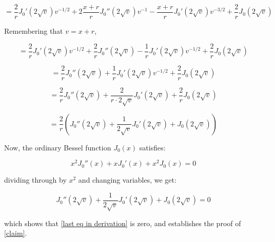 \documentclass{article}
\begin{document}
\begin{equation*}
=\frac{2}{r} J_0'(2\sqrt{v}) v^{-1/2} + 2\frac{x+r}{r} J_0''(2\sqrt{v}) v^{-1} - \frac{x+r}{r} J_0'(2\sqrt{v}) v^{-3/2}
+ \frac{2}{r} J_0(2\sqrt{v})
\end{equation*}

Remembering that $v=x+r$,


\begin{equation*}
=\frac{2}{r} J_0'(2\sqrt{v}) v^{-1/2} + \frac{2}{r} J_0''(2\sqrt{v}) - \frac{1}{r} J_0'(2\sqrt{v}) v^{-1/2}
+ \frac{2}{r} J_0(2\sqrt{v})
\end{equation*}

\begin{equation*}
=\frac{2}{r} J_0''(2\sqrt{v}) + \frac{1}{r} J_0'(2\sqrt{v}) v^{-1/2} + \frac{2}{r} J_0(2\sqrt{v})
\end{equation*}

\begin{equation*}
=\frac{2}{r} J_0''(2\sqrt{v}) + \frac{2}{r\cdot2\sqrt{v}} J_0'(2\sqrt{v}) + \frac{2}{r} J_0(2\sqrt{v})
\end{equation*}

\begin{equation}
\label{last eq in derivation}
=\frac{2}{r} \left( J_0''(2\sqrt{v}) + \frac{1}{2\sqrt{v}} J_0'(2\sqrt{v}) + J_0(2\sqrt{v})\right)
\end{equation}

Now, the ordinary Bessel function $J_0(x)$ satisfies:

\begin{equation*}
x^2 J_0''(x) + xJ_0'(x) + x^2J_0(x) = 0
\end{equation*}

dividing through by $x^2$ and changing variables, we get:

\begin{equation*}
J_0''(2\sqrt{v}) + \frac{1}{2\sqrt{v}}J_0'(2\sqrt{v}) + J_0(2\sqrt{v}) = 0
\end{equation*}

which shows that \eqref{last eq in derivation} is zero, and establishes the proof of \eqref{claim}.
\end{document}

